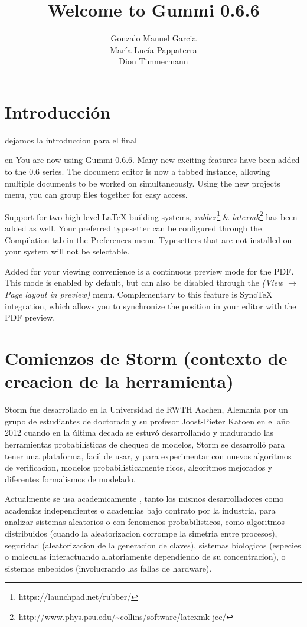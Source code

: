 \documentclass[11pt]{article}
\title{\textbf{Welcome to Gummi 0.6.6}}
\author{Gonzalo Manuel Garcia\\
		Mar\'ia Luc\'ia Pappaterra\\
		Dion Timmermann}
\date{}
\begin{document}
\maketitle

\section{Introducci\'on}

dejamos la introduccion para el final

 en You are now using Gummi 0.6.6. Many new exciting features have been added to the 0.6 series. The document editor is now a tabbed instance, allowing multiple documents to be worked on simultaneously. Using the new projects menu, you can group files together for easy access. 

Support for two high-level {\LaTeX} building systems, \emph{rubber}\footnote{https://launchpad.net/rubber/} \& \emph{latexmk}\footnote{http://www.phys.psu.edu/{\textasciitilde}collins/software/latexmk-jcc/} has been added as well. Your preferred typesetter can be configured through the Compilation tab in the Preferences menu. Typesetters that are not installed on your system will not be selectable. 

Added for your viewing convenience is a continuous preview mode for the PDF. This mode is enabled by default, but can also be disabled through the \emph{(View $\rightarrow$ Page layout in preview)} menu. Complementary to this feature is SyncTeX integration, which allows you to synchronize the position in your editor with the PDF preview. 

\section{Comienzos de Storm (contexto de creacion de la herramienta)}
Storm fue desarrollado en la Universidad de RWTH Aachen, Alemania por un grupo de estudiantes de doctorado y su profesor Joost-Pieter Katoen en el a\~no 2012 cuando en la \'ultima decada se estuv\'o desarrollando y madurando las herramientas probabil\'isticas de chequeo de modelos, Storm se desarroll\'o para tener una plataforma, facil de usar, y para experimentar con nuevos algoritmos de verificacion, modelos probabilisticamente ricos, algoritmos mejorados y diferentes formalismos de modelado.

Actualmente se usa academicamente , tanto los mismos desarrolladores como academias independientes o academias bajo contrato por la industria, para analizar sistemas aleatorios o con fenomenos probabilisticos, como algoritmos distribuidos (cuando la aleatorizacion corrompe la simetria entre procesos), seguridad (aleatorizacion de la generacion de claves), sistemas biologicos (especies o moleculas interactuando alatoriamente dependiendo de su concentracion), o sistemas enbebidos (involucrando las fallas de hardware). 
\end{document}
